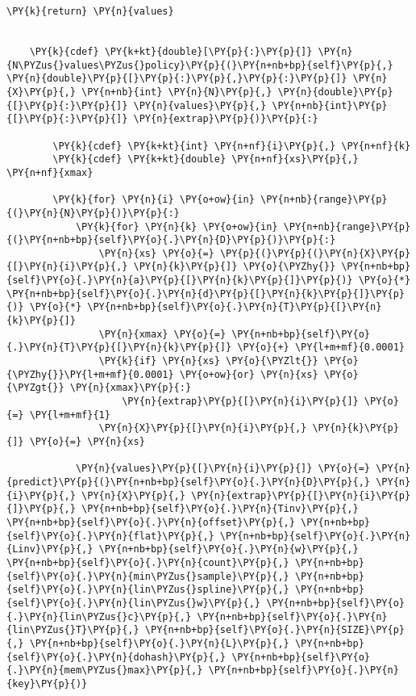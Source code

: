 \begin{Verbatim}[commandchars=\\\{\}]
        \PY{k}{return} \PY{n}{values}


    \PY{k}{cdef} \PY{k+kt}{double}[\PY{p}{:}\PY{p}{]} \PY{n}{N\PYZus{}values\PYZus{}policy}\PY{p}{(}\PY{n+nb+bp}{self}\PY{p}{,} \PY{n}{double}\PY{p}{[}\PY{p}{:}\PY{p}{,}\PY{p}{:}\PY{p}{]} \PY{n}{X}\PY{p}{,} \PY{n+nb}{int} \PY{n}{N}\PY{p}{,} \PY{n}{double}\PY{p}{[}\PY{p}{:}\PY{p}{]} \PY{n}{values}\PY{p}{,} \PY{n+nb}{int}\PY{p}{[}\PY{p}{:}\PY{p}{]} \PY{n}{extrap}\PY{p}{)}\PY{p}{:}
        
        \PY{k}{cdef} \PY{k+kt}{int} \PY{n+nf}{i}\PY{p}{,} \PY{n+nf}{k}
        \PY{k}{cdef} \PY{k+kt}{double} \PY{n+nf}{xs}\PY{p}{,} \PY{n+nf}{xmax}
        
        \PY{k}{for} \PY{n}{i} \PY{o+ow}{in} \PY{n+nb}{range}\PY{p}{(}\PY{n}{N}\PY{p}{)}\PY{p}{:}
            \PY{k}{for} \PY{n}{k} \PY{o+ow}{in} \PY{n+nb}{range}\PY{p}{(}\PY{n+nb+bp}{self}\PY{o}{.}\PY{n}{D}\PY{p}{)}\PY{p}{:}
                \PY{n}{xs} \PY{o}{=} \PY{p}{(}\PY{p}{(}\PY{n}{X}\PY{p}{[}\PY{n}{i}\PY{p}{,} \PY{n}{k}\PY{p}{]} \PY{o}{\PYZhy{}} \PY{n+nb+bp}{self}\PY{o}{.}\PY{n}{a}\PY{p}{[}\PY{n}{k}\PY{p}{]}\PY{p}{)} \PY{o}{*} \PY{n+nb+bp}{self}\PY{o}{.}\PY{n}{d}\PY{p}{[}\PY{n}{k}\PY{p}{]}\PY{p}{)} \PY{o}{*} \PY{n+nb+bp}{self}\PY{o}{.}\PY{n}{T}\PY{p}{[}\PY{n}{k}\PY{p}{]}
                \PY{n}{xmax} \PY{o}{=} \PY{n+nb+bp}{self}\PY{o}{.}\PY{n}{T}\PY{p}{[}\PY{n}{k}\PY{p}{]} \PY{o}{+} \PY{l+m+mf}{0.0001}
                \PY{k}{if} \PY{n}{xs} \PY{o}{\PYZlt{}} \PY{o}{\PYZhy{}}\PY{l+m+mf}{0.0001} \PY{o+ow}{or} \PY{n}{xs} \PY{o}{\PYZgt{}} \PY{n}{xmax}\PY{p}{:}
                    \PY{n}{extrap}\PY{p}{[}\PY{n}{i}\PY{p}{]} \PY{o}{=} \PY{l+m+mf}{1}
                \PY{n}{X}\PY{p}{[}\PY{n}{i}\PY{p}{,} \PY{n}{k}\PY{p}{]} \PY{o}{=} \PY{n}{xs}

            \PY{n}{values}\PY{p}{[}\PY{n}{i}\PY{p}{]} \PY{o}{=} \PY{n}{predict}\PY{p}{(}\PY{n+nb+bp}{self}\PY{o}{.}\PY{n}{D}\PY{p}{,} \PY{n}{i}\PY{p}{,} \PY{n}{X}\PY{p}{,} \PY{n}{extrap}\PY{p}{[}\PY{n}{i}\PY{p}{]}\PY{p}{,} \PY{n+nb+bp}{self}\PY{o}{.}\PY{n}{Tinv}\PY{p}{,} \PY{n+nb+bp}{self}\PY{o}{.}\PY{n}{offset}\PY{p}{,} \PY{n+nb+bp}{self}\PY{o}{.}\PY{n}{flat}\PY{p}{,} \PY{n+nb+bp}{self}\PY{o}{.}\PY{n}{Linv}\PY{p}{,} \PY{n+nb+bp}{self}\PY{o}{.}\PY{n}{w}\PY{p}{,} \PY{n+nb+bp}{self}\PY{o}{.}\PY{n}{count}\PY{p}{,} \PY{n+nb+bp}{self}\PY{o}{.}\PY{n}{min\PYZus{}sample}\PY{p}{,} \PY{n+nb+bp}{self}\PY{o}{.}\PY{n}{lin\PYZus{}spline}\PY{p}{,} \PY{n+nb+bp}{self}\PY{o}{.}\PY{n}{lin\PYZus{}w}\PY{p}{,} \PY{n+nb+bp}{self}\PY{o}{.}\PY{n}{lin\PYZus{}c}\PY{p}{,} \PY{n+nb+bp}{self}\PY{o}{.}\PY{n}{lin\PYZus{}T}\PY{p}{,} \PY{n+nb+bp}{self}\PY{o}{.}\PY{n}{SIZE}\PY{p}{,} \PY{n+nb+bp}{self}\PY{o}{.}\PY{n}{L}\PY{p}{,} \PY{n+nb+bp}{self}\PY{o}{.}\PY{n}{dohash}\PY{p}{,} \PY{n+nb+bp}{self}\PY{o}{.}\PY{n}{mem\PYZus{}max}\PY{p}{,} \PY{n+nb+bp}{self}\PY{o}{.}\PY{n}{key}\PY{p}{)}
    

\end{Verbatim}
